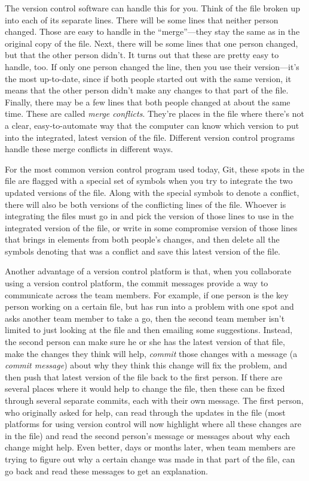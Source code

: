 \documentclass[]{tufte-book}
\begin{document}
The version control software can handle this for you. Think of the file broken
up into each of its separate lines. There will be some lines that neither person
changed. Those are easy to handle in the ``merge''---they stay the same as in the
original copy of the file. Next, there will be some lines that one person
changed, but that the other person didn't. It turns out that these are pretty
easy to handle, too. If only one person changed the line, then you use their
version---it's the most up-to-date, since if both people started out with the
same version, it means that the other person didn't make any changes to that
part of the file. Finally, there may be a few lines that both people changed at
about the same time. These are called \emph{merge conflicts}. They're places in the
file where there's not a clear, easy-to-automate way that the computer can know
which version to put into the integrated, latest version of the file. Different
version control programs handle these merge conflicts in different ways.

For the most common version control program used today, Git, these spots in
the file are flagged with a special set of symbols when you try to integrate the
two updated versions of the file. Along with the special symbols to denote a
conflict, there will also be both versions of the conflicting lines of the
file. Whoever is integrating the files must go in and pick the version of those
lines to use in the integrated version of the file, or write in some compromise
version of those lines that brings in elements from both people's changes, and
then delete all the symbols denoting that was a conflict and save this latest
version of the file.

Another advantage of a version control platform is that, when you collaborate
using a version control platform, the commit messages provide a way to
communicate across the team members. For example, if one person is the key
person working on a certain file, but has run into a problem with one spot and
asks another team member to take a go, then the second team member isn't limited
to just looking at the file and then emailing some suggestions. Instead, the
second person can make sure he or she has the latest version of that file, make
the changes they think will help,
\emph{commit} those changes with a message (a \emph{commit message}) about why they think
this change will fix the problem, and then push that latest version of the file
back to the first person. If there are several places where it would help to
change the file, then these can be fixed through several separate commits, each
with their own message. The first person, who originally asked for help, can
read through the updates in the file (most platforms for using version control
will now highlight where all these changes are in the file) and read the second
person's message or messages about why each change might help. Even better, days
or months later, when team members are trying to figure out why a certain change
was made in that part of the file, can go back and read these messages to get an
explanation.
\end{document}
